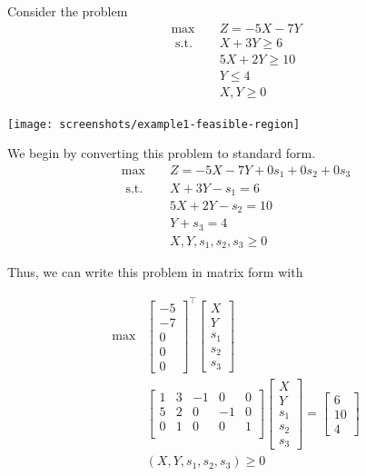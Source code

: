 \documentclass[letter,12pt]{book}
\renewcommand{\0}{\mathbf{0}}
\begin{document}
\begin{example}{}{}
Consider the problem
\begin{align*}
\max \quad & Z =-5 X-7 Y  \\ 
\text { s.t. } \quad & X+3 Y \geq 6 \\ 
&5 X+ 2 Y \geq 10 \\ 
&Y  \leq 4 \\ 
&X, Y  \geq 0 
\end{align*}

\begin{center}
\texttt{[image: screenshots/example1-feasible-region]}
\end{center}

We begin by converting this problem to standard form.  
\begin{align*}
\max \quad & Z =-5 X-7 Y + 0s_1 + 0s_2 + 0 s_3\\ 
\text { s.t. } \quad & X+3 Y - s_1 = 6 \\ 
&5 X+ 2 Y - s_2 = 10 \\ 
&Y  + s_3 = 4 \\ 
&X, Y, s_1, s_2, s_3  \geq 0 
\end{align*}

Thus, we can write this problem in matrix form with 

\begin{align}
\max  & \begin{bmatrix}
-5 \\ -7 \\ 0 \\ 0 \\0
\end{bmatrix}^\top \begin{bmatrix}
X\\Y\\s_1\\s_2\\ s_3
\end{bmatrix}\\
&\begin{bmatrix}
1 & 3 & -1 & 0 & 0 \\
5 & 2 & 0 & -1 & 0\\
0 & 1 & 0 & 0 & 1\\
\end{bmatrix}
\begin{bmatrix}
X \\ Y \\ s_1 \\ s_2 \\ s_3
\end{bmatrix}
= 
\begin{bmatrix}
6 \\ 10 \\ 4
\end{bmatrix}\\
&(X,Y,s_1, s_2, s_3) \geq 0
\end{align}


\end{example}
\end{document}
